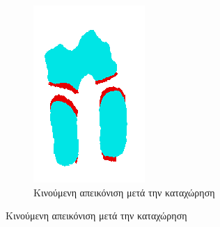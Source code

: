 \documentclass[a4paper,12pt]{article}
\begin{document}
\begin{figure}[H]
\begin{subfigure}[t]{0.4\linewidth}
    \includegraphics[width=\linewidth]{moving_label_after_registration_2.png}
    \caption{Κινούμενη απεικόνιση μετά την καταχώρηση}
    \end{subfigure}


\end{figure}
\end{document}
